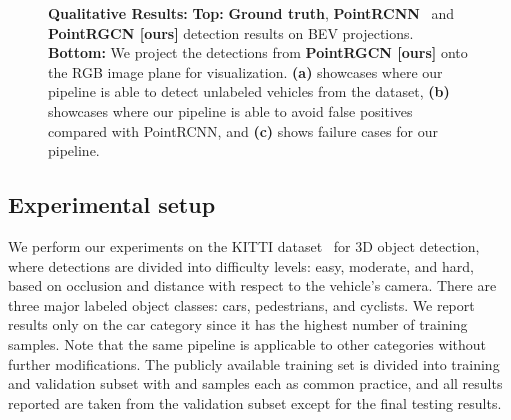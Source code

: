\documentclass[10pt,twocolumn,letterpaper]{article}
\begin{document}
\begin{figure*}[!htbp]
    \centering
\caption{
    \textbf{Qualitative Results:}
\textbf{Top:}
    \textbf{\color{RoyalBlue}Ground truth},
    \textbf{\color{Green}PointRCNN}~\cite{shi2019pointrcnn} and
    \textbf{\color{Red}PointRGCN [ours]} detection results on BEV projections.
    \textbf{Bottom:}
    We project the detections from \textbf{\color{Red}PointRGCN [ours]} onto the RGB image plane for visualization. \textbf{(a)} showcases where our pipeline is able to detect unlabeled vehicles from the dataset, \textbf{(b)} showcases where our pipeline is able to avoid false positives compared with PointRCNN, and \textbf{(c)} shows failure cases for our pipeline.
    }
    \label{fig:Qualitative_Detection}
\end{figure*}




\subsection{Experimental setup}





We perform our experiments on the KITTI dataset~\cite{Geiger2012KITTI} for 3D object detection, where detections are divided into  difficulty levels: easy, moderate, and hard, based on occlusion and distance with respect to the vehicle's camera.
There are three major labeled object classes: cars, pedestrians, and cyclists.
We report results only on the car category since it has the highest number of training samples.
Note that the same pipeline is applicable to other categories without further modifications.
The publicly available training set is divided into training and validation subset with  and  samples each as common practice, and all results reported are taken from the validation subset except for the final testing results.
\end{document}
